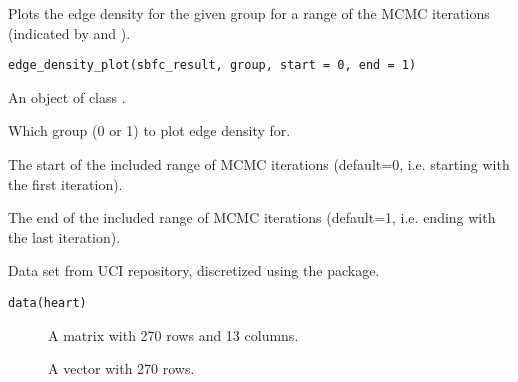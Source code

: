 \documentclass[a4paper]{book}
\begin{document}
%
\begin{Description}\relax
Plots the edge density for the given group for a range of the MCMC iterations (indicated by  and ).
\end{Description}
%
\begin{Usage}
\begin{verbatim}
edge_density_plot(sbfc_result, group, start = 0, end = 1)
\end{verbatim}
\end{Usage}
%
\begin{Arguments}
\begin{ldescription}
\item[\code{sbfc\_result}] An object of class .

\item[\code{group}] Which group (0 or 1) to plot edge density for.

\item[\code{start}] The start of the included range of MCMC iterations (default=0, i.e. starting with the first iteration).

\item[\code{end}] The end of the included range of MCMC iterations (default=1, i.e. ending with the last iteration).
\end{ldescription}
\end{Arguments}
%
\begin{Description}\relax
Data set from UCI repository, discretized using the  package.
\end{Description}
%
\begin{Usage}
\begin{verbatim}
data(heart)
\end{verbatim}
\end{Usage}
%
\begin{Format}
\begin{description}

\item[] A matrix with 270 rows and 13 columns.
\item[] A vector with 270 rows.

\end{description}
\end{Format}
%
\begin{References}\relax
{}

\end{References}
\end{document}
